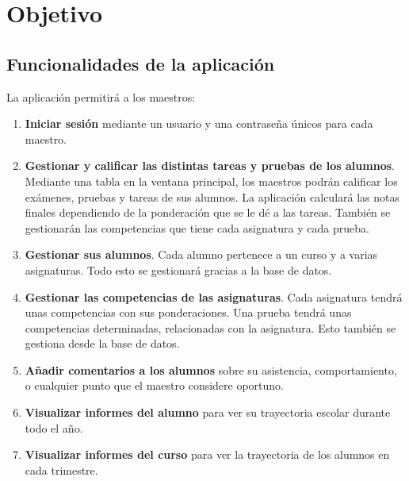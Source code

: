 \chapter{Objetivo}
\label{cap:objetivo}


\section{Funcionalidades de la aplicación} \label{funcionalidades}

La aplicación permitirá a los maestros:
\begin{enumerate}
	\item \textbf{Iniciar sesión} mediante un usuario y una contraseña únicos para cada maestro.
	\item \textbf{Gestionar y calificar las distintas tareas y pruebas de los alumnos}. Mediante una tabla en la ventana principal, los maestros podrán calificar los exámenes, pruebas y tareas de sus alumnos. La aplicación calculará las notas finales dependiendo de la ponderación que se le dé a las tareas. También se gestionarán las competencias que tiene cada asignatura y cada prueba.
	\item \textbf{Gestionar sus alumnos}. Cada alumno pertenece a un curso y a varias asignaturas. Todo esto se gestionará gracias a la base de datos.
	\item \textbf{Gestionar las competencias de las asignaturas}. Cada asignatura tendrá unas competencias con sus ponderaciones. Una prueba tendrá unas competencias determinadas, relacionadas con la asignatura. Esto también se gestiona desde la base de datos.
	\item \textbf{Añadir comentarios a los alumnos} sobre su asistencia, comportamiento, o cualquier punto que el maestro considere oportuno.
	\item \textbf{Visualizar informes del alumno} para ver su trayectoria escolar durante todo el año.
	\item \textbf{Visualizar informes del curso} para ver la trayectoria de los alumnos en cada trimestre.
	

\end{enumerate}

